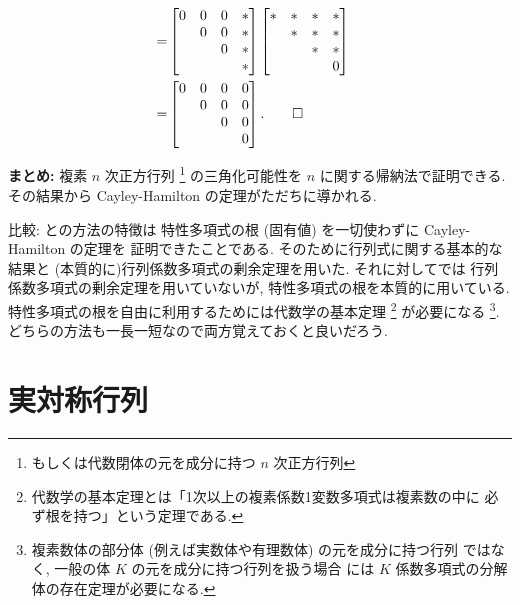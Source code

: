 \documentclass[12pt,twoside]{jarticle}
\begin{document}
\begin{align*}
  \\
  = &
  \begin{bmatrix}
    0 & 0 & 0 & * \\
      & 0 & 0 & * \\
      &   & 0 & * \\
      &   &   & * \\
  \end{bmatrix}
  \begin{bmatrix}
    * & * & * & * \\
      & * & * & * \\
      &   & * & * \\
      &   &   & 0 \\
  \end{bmatrix}
  \\
  = &
  \begin{bmatrix}
    0 & 0 & 0 & 0 \\
      & 0 & 0 & 0 \\
      &   & 0 & 0 \\
      &   &   & 0 \\
  \end{bmatrix}.
  \qed
\end{align*}

\bigskip
\noindent
{\large {\bf まとめ:} 複素 $n$ 次正方行列%
  \footnote{もしくは代数閉体の元を成分に持つ $n$ 次正方行列}
  の三角化可能性を $n$ に関する帰納法で証明できる.
  その結果から Cayley-Hamilton の定理がただちに導かれる.}

\bigskip
\noindent
比較: との方法の特徴は
特性多項式の根 (固有値) を一切使わずに Cayley-Hamilton の定理を
証明できたことである.  
そのために行列式に関する基本的な結果と
(本質的に)行列係数多項式の剰余定理を用いた.  
それに対してでは
行列係数多項式の剰余定理を用いていないが, 
特性多項式の根を本質的に用いている.  
特性多項式の根を自由に利用するためには代数学の基本定理%
\footnote{代数学の基本定理とは「1次以上の複素係数1変数多項式は複素数の中に
  必ず根を持つ」という定理である.}
が必要になる%
\footnote{複素数体の部分体 (例えば実数体や有理数体) の元を成分に持つ行列
  ではなく, 一般の体 $K$ の元を成分に持つ行列を扱う場合
  には $K$ 係数多項式の分解体の存在定理が必要になる.}.  %
どちらの方法も一長一短なので両方覚えておくと良いだろう.


\section{実対称行列}
\label{sec:real-symmetric}
\end{document}
